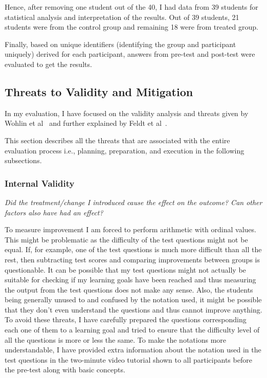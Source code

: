 Hence, after removing one student out of the 40, I had data from 39 students for statistical analysis and interpretation of the results. Out of 39 students, 21 students were from the control group and remaining 18 were from treated group.

Finally, based on unique identifiers (identifying the group and participant uniquely) derived for each participant, answers from pre-test and post-test were evaluated to get the results. 

\subsection{Threats to Validity and Mitigation}\label{subsec:threats&mitigation}
In my evaluation, I have focused on the validity analysis and threats given by Wohlin et al~\cite{expinse} and further explained by Feldt et al~\cite{validitythreatsinse}. 

This section describes all the threats that are associated with the entire evaluation process i.e., planning, preparation, and execution in the following subsections.
 
\subsubsection{Internal Validity}\label{subsubsec:internalvalidity}
\emph{Did the treatment/change I introduced cause the effect on the outcome? Can other factors also have had an effect?}

\medskip
\noindent To measure improvement I am forced to perform arithmetic with ordinal values.
This might be problematic as the difficulty of the test questions might not be equal. If, for example, one of the test questions is much more difficult than all the rest, then subtracting test scores and comparing improvements between groups is questionable. It can be possible that my test questions might not actually be suitable for checking if my learning goals have been reached and thus measuring the output from the test questions does not make any sense. Also, the students being generally unused to and confused by the notation used, it might be possible that they don't even understand the questions and thus cannot improve anything. To avoid these threats, I have carefully prepared the questions corresponding each one of them to a learning goal and tried to ensure that the difficulty level of all the questions is more or less the same. To make the notations more understandable, I have provided extra information about the notation used in the test questions in the two-minute video tutorial shown to all participants before the pre-test along with basic concepts.

